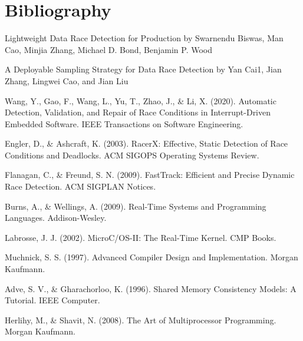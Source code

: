 \documentclass[
fancyheadings, %
%
%
]{stsreprt}
\begin{document}
\chapter{Bibliography}
Lightweight Data Race Detection for Production by Swarnendu Biswas, Man Cao, Minjia Zhang, Michael D. Bond, Benjamin P. Wood


A Deployable Sampling Strategy for Data Race Detection by Yan Cai1, Jian Zhang, Lingwei Cao, and Jian Liu
\begin{thebibliography}{9}
	Wang, Y., Gao, F., Wang, L., Yu, T., Zhao, J., \& Li, X. (2020). Automatic Detection, Validation, and Repair of Race Conditions in Interrupt-Driven Embedded Software. IEEE Transactions on Software Engineering.
	
	Engler, D., \& Ashcraft, K. (2003). RacerX: Effective, Static Detection of Race Conditions and Deadlocks. ACM SIGOPS Operating Systems Review.
	
	Flanagan, C., \& Freund, S. N. (2009). FastTrack: Efficient and Precise Dynamic Race Detection. ACM SIGPLAN Notices.
	
	Burns, A., \& Wellings, A. (2009). Real-Time Systems and Programming Languages. Addison-Wesley.
	
	Labrosse, J. J. (2002). MicroC/OS-II: The Real-Time Kernel. CMP Books.
	
	Muchnick, S. S. (1997). Advanced Compiler Design and Implementation. Morgan Kaufmann.
	
	Adve, S. V., \& Gharachorloo, K. (1996). Shared Memory Consistency Models: A Tutorial. IEEE Computer.
	
	Herlihy, M., \& Shavit, N. (2008). The Art of Multiprocessor Programming. Morgan Kaufmann.
\end{thebibliography}
\end{document}
